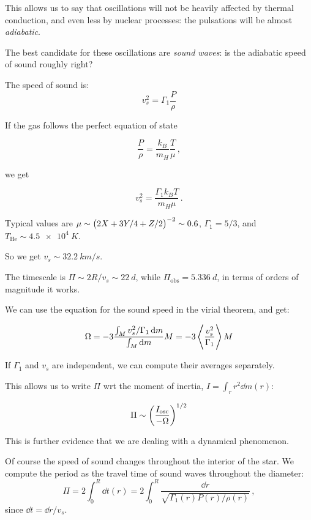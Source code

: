 \documentclass[main.tex]{subfiles}
\begin{document}
This allows us to say that oscillations will not be heavily affected by thermal conduction, and even less by nuclear processes: the pulsations will be almost \emph{adiabatic}.

The best candidate for these oscillations are \emph{sound waves}: is the adiabatic speed of sound roughly right?

The speed of sound is:
%
\begin{equation}
  v_s^2 = \Gamma_1 \frac{P}{\rho}
\end{equation}

If the gas follows the perfect equation of state

\begin{equation}
  \frac{P}{\rho} = \frac{k_B}{m_H} \frac{T}{\mu}  \,,
\end{equation}

we get

\begin{equation}
  v_s^2 = \frac{\Gamma_1 k_B T}{m_H \mu}  \,.
\end{equation}

Typical values are \(\mu \sim \qty(2X + 3Y/4 + Z/2)^{-2} \sim 0.6\), \(\Gamma_1 = 5/3\), and \(T_{\text{He}} \sim \SI{4.5e4}{K} \).

So we get \(v_s \sim \SI{32.2}{km/s}\).

The timescale is \(\Pi \sim 2R/v_s \sim \SI{22}{d}\), while \(\Pi_{\text{obs}} = \SI{5.336}{d} \), in terms of orders of magnitude it works.

We can use the equation for the sound speed in the virial theorem, and get:

\begin{equation}
  \Omega = - 3 \frac{\int _{M}  v_s^2 / \Gamma_1 \dd{m}}{\int_M \dd{m}}M = -3 \expval{\frac{v_s^2}{\Gamma_1}} M
\end{equation}

If \(\Gamma_1 \) and \(v_s\) are independent, we can compute their averages separately.

This allows us to write \(\Pi  \) wrt the moment of inertia, \(I = \int_r r^2 \dd{m}(r)\):

\begin{equation}
  \Pi \sim \qty(\frac{I_{\text{osc}}}{-\Omega} )^{1/2}
\end{equation}

This is further evidence that we are dealing with a dynamical phenomenon.

Of course the speed of sound changes throughout the interior of the star.
We compute the period as the travel time of sound waves throughout the diameter:
%
\begin{equation}
  \Pi = 2 \int _{0}   ^{R} \dd{t(r)} = 2 \int_0^R \frac{\dd{r} }{\sqrt{\Gamma_1(r) P(r) / \rho(r)}}\,,
\end{equation}
%
since \(\dd{t} = \dd{r} / v_s\).
\end{document}
